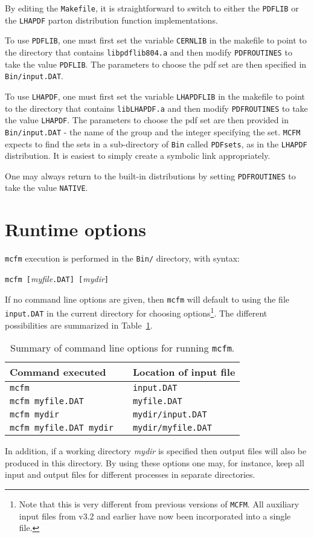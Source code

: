 \documentclass[12pt]{article}
\begin{document}
By editing the {\tt Makefile}, it is straightforward to switch to
either the {\tt PDFLIB} or the {\tt LHAPDF} parton distribution
function implementations.

To use {\tt PDFLIB}, one must first set the variable {\tt CERNLIB}
in the makefile to point to the directory that contains
{\tt libpdflib804.a} and then modify {\tt PDFROUTINES} to
take the value {\tt PDFLIB}. The parameters to choose the
pdf set are then specified in {\tt Bin/input.DAT}.

To use {\tt LHAPDF}, one must first set the variable {\tt LHAPDFLIB}
in the makefile to point to the directory that contains
{\tt libLHAPDF.a} and then modify {\tt PDFROUTINES} to
take the value {\tt LHAPDF}. The parameters to choose the
pdf set are then provided in {\tt Bin/input.DAT} - 
the name of the group and the integer specifying 
the set.
{\tt MCFM} expects to find the sets in a sub-directory of {\tt Bin} called
{\tt PDFsets}, as in the {\tt LHAPDF} distribution. It is easiest to
simply create a symbolic link appropriately.

One may always return to the built-in distributions by setting
{\tt PDFROUTINES} to take the value {\tt NATIVE}.

\section{Runtime options}

{\tt mcfm} execution is performed in the {\tt Bin/} directory,
with syntax:
\begin{center}
{\tt mcfm [}{\it myfile}{\tt .DAT] [}{\it mydir}{\tt ]}
\end{center}
If no command line options are given, then {\tt mcfm} will default
to using the file {\tt input.DAT} in the current directory for
choosing options\footnote{Note that this is very different from
previous versions of {\tt MCFM}. All auxiliary input files from v3.2 and
earlier have now been incorporated into a single file.}.
The different possibilities are summarized in Table~\ref{clopts}.
\begin{table}
\begin{center}
\begin{tabular}{l|cl}
Command executed && Location of input file \\
\hline
{\tt mcfm}                      && {\tt input.DAT} \\
{\tt mcfm myfile.DAT}           && {\tt myfile.DAT} \\
{\tt mcfm mydir}                && {\tt mydir/input.DAT} \\
{\tt mcfm myfile.DAT mydir}     && {\tt mydir/myfile.DAT} \\
\end{tabular}
\end{center}
\caption{Summary of command line options for running {\tt mcfm}.}
\label{clopts}
\end{table}
In addition, if a working directory {\it mydir} is specified then
output files will also be produced in this directory. By using these
options one may, for instance, keep all input and output files for
different processes in separate directories.
\end{document}
